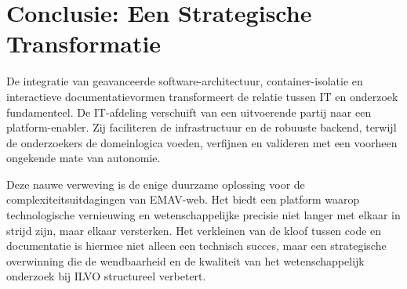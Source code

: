 \section{Conclusie: Een Strategische Transformatie}
De integratie van geavanceerde software-architectuur, container-isolatie en interactieve documentatievormen transformeert de relatie tussen IT en onderzoek fundamenteel. De IT-afdeling verschuift van een uitvoerende partij naar een platform-enabler. Zij faciliteren de infrastructuur en de robuuste backend, terwijl de onderzoekers de domeinlogica voeden, verfijnen en valideren met een voorheen ongekende mate van autonomie.

Deze nauwe verweving is de enige duurzame oplossing voor de complexiteitsuitdagingen van EMAV-web. Het biedt een platform waarop technologische vernieuwing en wetenschappelijke precisie niet langer met elkaar in strijd zijn, maar elkaar versterken. Het verkleinen van de kloof tussen code en documentatie is hiermee niet alleen een technisch succes, maar een strategische overwinning die de wendbaarheid en de kwaliteit van het wetenschappelijk onderzoek bij ILVO structureel verbetert.
